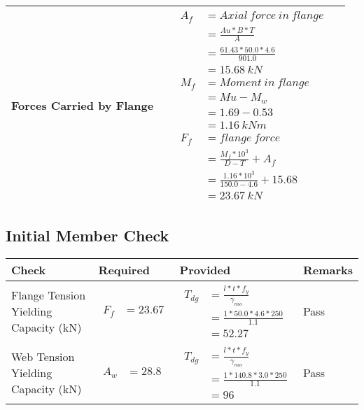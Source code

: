 \documentclass{article}%
\begin{document}
\begin{longtable}{|p{4cm}|p{3.5cm}|p{6.5cm}|p{1.5cm}|}
\hline%
Forces Carried by Flange&&$\begin{aligned} A_f&= Axial~force~ in ~flange  \\ &= \frac{Au * B *T}{A} \\ &= \frac{61.43 * 50.0*4.6}{901.0} \\ &=15.68~ kN\\ M_f& =Moment~ in~ flange \\  & = Mu-M_w\\ &= 1.69-0.53\\ &=1.16~{kNm}\\  F_f& =flange~force  \\ & = \frac{M_f *10^3}{D-T} + A_f \\ &= \frac{1.16* 10^3}{150.0-4.6} +15.68 \\ &=23.67~kN \end{aligned}$&\\%
\hline%
\end{longtable}

%
\newpage%
\subsection{Initial Member Check}%
\label{subsec:InitialMemberCheck}%
\renewcommand{\arraystretch}{1.2}%
\begin{longtable}{|p{3cm}|p{4.5cm}|p{6.5cm}|p{1.5cm}|}%
\hline%
\rowcolor{OsdagGreen}%
Check&Required&Provided&Remarks\\%
\hline%
\endhead%
\hline%
Flange Tension Yielding Capacity (kN)&$\begin{aligned} F_f &=23.67\end{aligned}$&$\begin{aligned} T_{dg} &= \frac{l*t*f_y}{\gamma_{mo}}\\ &=\frac{1*50.0*4.6*250}{1.1}\\ &=52.27\end{aligned}$&Pass\\%
\hline%
Web Tension Yielding Capacity (kN)&$\begin{aligned} A_w &=28.8\end{aligned}$&$\begin{aligned} T_{dg} &= \frac{l*t*f_y}{\gamma_{mo}}\\ &=\frac{1*140.8*3.0*250}{1.1}\\ &=96\end{aligned}$&Pass\\%
\hline%
\end{longtable}
\end{document}
